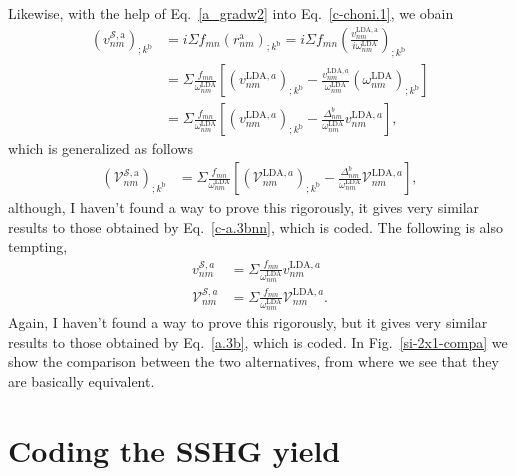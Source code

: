 Likewise, with the help
of Eq.~\eqref{a_gradw2} into
Eq.~\eqref{c-choni.1}, we obain
\begin{align}\label{ccu54}
(v^{\mathcal{S},\mathrm{a}}_{nm})_{;k^\mathrm{b}}&=
i\Sigma f_{mn}(r^\mathrm{a}_{nm})_{;k^\mathrm{b}}
=
i\Sigma f_{mn}\left(\frac{v^{\mathrm{LDA},\mathrm{a}}_{nm}}{i\omega^\mathrm{LDA}_{nm}}\right)_{;k^\mathrm{b}}
\nonumber\\
&=
\Sigma\frac{f_{mn}}{\omega^\mathrm{LDA}_{nm}}\left[
\left(v^{\mathrm{LDA},a}_{nm}\right)_{;k^\mathrm{b}}
-
\frac{v^{\mathrm{LDA},a}_{nm}}{\omega^\mathrm{LDA}_{nm}}\left(\omega^\mathrm{LDA}_{nm}\right)_{;k^\mathrm{b}}
\right]
\nonumber\\
&=
\Sigma\frac{f_{mn}}{\omega^\mathrm{LDA}_{nm}}\left[
\left(v^{\mathrm{LDA},a}_{nm}\right)_{;k^\mathrm{b}}
-
\frac{\Delta^{b}_{nm}}{\omega^\mathrm{LDA}_{nm}}v^{\mathrm{LDA},a}_{nm}
\right]
,
\end{align}
which is generalized as follows 
\begin{align}\label{ccu55}
(\mathcal{V}^{\mathcal{S},\mathrm{a}}_{nm})_{;k^\mathrm{b}}&=
\Sigma\frac{f_{mn}}{\omega^\mathrm{LDA}_{nm}}\left[
\left(\mathcal{V}^{\mathrm{LDA},a}_{nm}\right)_{;k^\mathrm{b}}
-
\frac{\Delta^{b}_{nm}}{\omega^\mathrm{LDA}_{nm}}\mathcal{V}^{\mathrm{LDA},a}_{nm}
\right]
,
\end{align}
although, I haven't found a way to prove this rigorously, it gives 
very similar results to those obtained by Eq.~\eqref{c-a.3bnn}, which 
is coded. 
The following is also tempting,
\begin{align}\label{temp.1}
v^{\mathcal{S},a}_{nm}
&=\Sigma\frac{f_{mn}}{\omega^\mathrm{LDA}_{nm}}
v^{\mathrm{LDA},a}_{nm}
\nonumber\\
\mathcal{V}^{\mathcal{S},a}_{nm}
&=\Sigma\frac{f_{mn}}{\omega^\mathrm{LDA}_{nm}}
\mathcal{V}^{\mathrm{LDA},a}_{nm}
.
\end{align}
Again, I haven't found a way to prove this rigorously, but it gives 
very similar results to those obtained by Eq.~\eqref{a.3b}, which 
is coded. In Fig.~\ref{si-2x1-compa} we show the comparison between
the two alternatives, from where we see that they are basically equivalent. 



\section{Coding the SSHG yield}

